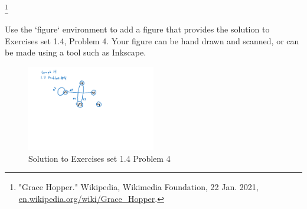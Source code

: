 \documentclass{article}
\begin{document}
\footnote{"Grace Hopper." Wikipedia, Wikimedia Foundation, 22 Jan. 2021, \url{en.wikipedia.org/wiki/Grace_Hopper}.}


Use the `figure` environment to add a figure that provides the solution to
Exercises set 1.4, Problem 4.  Your figure can be hand drawn and scanned, or can
be made using a tool such as Inkscape.

	\begin{figure}[h]
		\caption{Solution to Exercises set 1.4 Problem 4}
		\centering
			\includegraphics[width=0.5\textwidth]{H-1_Figure}
	\end{figure}
\end{document}

